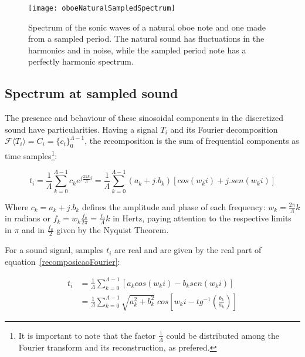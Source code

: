 \documentclass[
 aip,
 jmp,
 amsmath,amssymb,
 reprint,
]{revtex4-1}
\begin{document}
\begin{figure*}
    \centering
        \texttt{[image: oboeNaturalSampledSpectrum]}
    \caption{Spectrum of the sonic waves of a natural oboe note and one made from a sampled period. The natural sound has fluctuations in the harmonics and in noise, while the sampled period note has a perfectly harmonic spectrum.}
        \label{fig:espectroOboe}
\end{figure*}


\subsection{Spectrum at sampled sound}
The presence and behaviour of these sinosoidal components in the discretized sound have particularities. Having a signal $T_i$ and its Fourier decomposition $\mathcal{F}\langle T_i\rangle=C_i=\{c_i\}_0^{\Lambda-1}$, the recomposition is the sum of frequential components as time samples\footnote{It is important to note that the factor $\frac{1}{\Lambda}$ could be distributed among the Fourier transform and its reconstruction, as prefered.}:

\begin{equation}\label{recomposicaoFourier}
t_i = \frac{1}{\Lambda}\sum_{k=0}^{\Lambda-1}c_ke^{j \frac{2\pi k}{\Lambda} i } = \frac{1}{\Lambda}\sum_{k=0}^{\Lambda-1}(a_k+ j . b_k)\left[cos(w_k i) +j . sen(w_k i)\right]
\end{equation}

Where $c_k = a_k + j . b_k$ defines the amplitude and phase of each frequency: $w_k=\frac{2\pi}{\Lambda}k$ in radians or $f_k=w_k\frac{f_a}{2\pi}=\frac{f_a}{\Lambda}k$ in Hertz, paying attention to the respective limits in $\pi$ and in $\frac{f_a}{2}$ given by the Nyquist Theorem. 

For a sound signal, samples $t_i$ are real and are given by the real part of equation~\ref{recomposicaoFourier}:

\begin{equation}\label{moduloEfase}
\begin{split}
t_i& = \frac{1}{\Lambda}\sum_{k=0}^{\Lambda-1}\left[a_k cos(w_k i) -b_k sen(w_k i)\right] \\
   & = \frac{1}{\Lambda}\sum_{k=0}^{\Lambda-1}\sqrt{a_k^2 + b_k^2} \; cos\left[w_k i - tg^{-1}\left(\frac{b_k}{a_k}\right)\right]
\end{split}
\end{equation}
\end{document}
